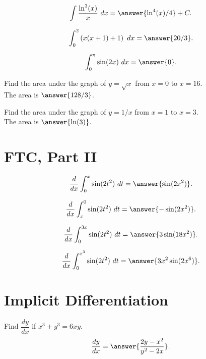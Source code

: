 \documentclass[handout]{ximera}
\begin{document}
\begin{problem}
\[\int \frac{\ln^3(x)}{x} \ dx = \answer{\ln^4(x) /4} + C.\]
\end{problem}

\begin{problem}
\[\int_0^2  \left(x(x+1) + 1 \right) \ dx = \answer{20/3}.\]
\end{problem}

\begin{problem}
\[\int_0^\pi  \sin(2x) \ dx = \answer{0}.\]
\end{problem}

\begin{problem}
Find the area under the graph of $y = \sqrt x$ from $x=0$ to $x=16$.\\
The area is $\answer{128/3}$.
\end{problem}

\begin{problem}
Find the area under the graph of $y = 1/x$ from $x=1$ to $x=3$.\\
The area is $\answer{\ln(3)}$.
\end{problem}


\section{FTC, Part II}

\begin{problem}
\[\frac{d}{dx} \int_0^x \sin(2t^2) \ dt = \answer{\sin(2x^2)}.\]
\end{problem}

\begin{problem}
\[\frac{d}{dx} \int_x^0 \sin(2t^2) \ dt = \answer{-\sin(2x^2)}.\]
\end{problem}

\begin{problem}
\[\frac{d}{dx} \int_0^{3x} \sin(2t^2) \ dt = \answer{3\sin(18x^2)}.\]
\end{problem}

\begin{problem}
\[\frac{d}{dx} \int_0^{x^3} \sin(2t^2) \ dt = \answer{3x^2\sin(2x^6)}.\]
\end{problem}



\section{Implicit Differentiation}

\begin{problem}
Find $\dfrac{dy}{dx}$ if $x^3 + y^3 = 6xy$.
\[\frac{dy}{dx} = \answer{\frac{2y - x^2}{y^2 - 2x}}.\]
\end{problem}
\end{document}
